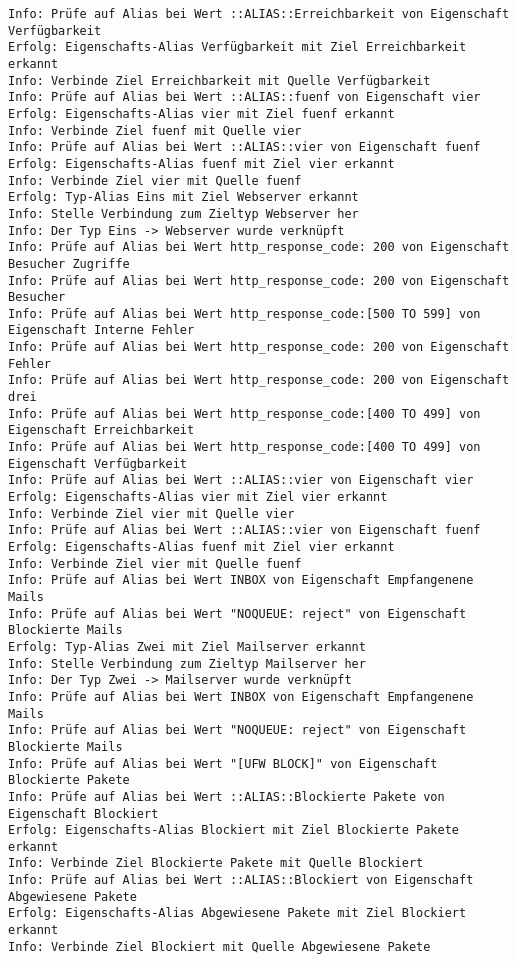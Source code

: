 \begin{lstlisting}[label=log-start, numbers=none]
Info: Prüfe auf Alias bei Wert ::ALIAS::Erreichbarkeit von Eigenschaft Verfügbarkeit 
Erfolg: Eigenschafts-Alias Verfügbarkeit mit Ziel Erreichbarkeit erkannt 
Info: Verbinde Ziel Erreichbarkeit mit Quelle Verfügbarkeit 
Info: Prüfe auf Alias bei Wert ::ALIAS::fuenf von Eigenschaft vier 
Erfolg: Eigenschafts-Alias vier mit Ziel fuenf erkannt 
Info: Verbinde Ziel fuenf mit Quelle vier 
Info: Prüfe auf Alias bei Wert ::ALIAS::vier von Eigenschaft fuenf 
Erfolg: Eigenschafts-Alias fuenf mit Ziel vier erkannt 
Info: Verbinde Ziel vier mit Quelle fuenf 
Erfolg: Typ-Alias Eins mit Ziel Webserver erkannt 
Info: Stelle Verbindung zum Zieltyp Webserver her 
Info: Der Typ Eins -> Webserver wurde verknüpft 
Info: Prüfe auf Alias bei Wert http_response_code: 200 von Eigenschaft Besucher Zugriffe 
Info: Prüfe auf Alias bei Wert http_response_code: 200 von Eigenschaft Besucher 
Info: Prüfe auf Alias bei Wert http_response_code:[500 TO 599] von Eigenschaft Interne Fehler 
Info: Prüfe auf Alias bei Wert http_response_code: 200 von Eigenschaft Fehler 
Info: Prüfe auf Alias bei Wert http_response_code: 200 von Eigenschaft drei 
Info: Prüfe auf Alias bei Wert http_response_code:[400 TO 499] von Eigenschaft Erreichbarkeit 
Info: Prüfe auf Alias bei Wert http_response_code:[400 TO 499] von Eigenschaft Verfügbarkeit 
Info: Prüfe auf Alias bei Wert ::ALIAS::vier von Eigenschaft vier 
Erfolg: Eigenschafts-Alias vier mit Ziel vier erkannt 
Info: Verbinde Ziel vier mit Quelle vier 
Info: Prüfe auf Alias bei Wert ::ALIAS::vier von Eigenschaft fuenf 
Erfolg: Eigenschafts-Alias fuenf mit Ziel vier erkannt 
Info: Verbinde Ziel vier mit Quelle fuenf 
Info: Prüfe auf Alias bei Wert INBOX von Eigenschaft Empfangenene Mails 
Info: Prüfe auf Alias bei Wert "NOQUEUE: reject" von Eigenschaft Blockierte Mails 
Erfolg: Typ-Alias Zwei mit Ziel Mailserver erkannt 
Info: Stelle Verbindung zum Zieltyp Mailserver her 
Info: Der Typ Zwei -> Mailserver wurde verknüpft 
Info: Prüfe auf Alias bei Wert INBOX von Eigenschaft Empfangenene Mails 
Info: Prüfe auf Alias bei Wert "NOQUEUE: reject" von Eigenschaft Blockierte Mails 
Info: Prüfe auf Alias bei Wert "[UFW BLOCK]" von Eigenschaft Blockierte Pakete 
Info: Prüfe auf Alias bei Wert ::ALIAS::Blockierte Pakete von Eigenschaft Blockiert 
Erfolg: Eigenschafts-Alias Blockiert mit Ziel Blockierte Pakete erkannt 
Info: Verbinde Ziel Blockierte Pakete mit Quelle Blockiert 
Info: Prüfe auf Alias bei Wert ::ALIAS::Blockiert von Eigenschaft Abgewiesene Pakete 
Erfolg: Eigenschafts-Alias Abgewiesene Pakete mit Ziel Blockiert erkannt 
Info: Verbinde Ziel Blockiert mit Quelle Abgewiesene Pakete 

\end{lstlisting}
